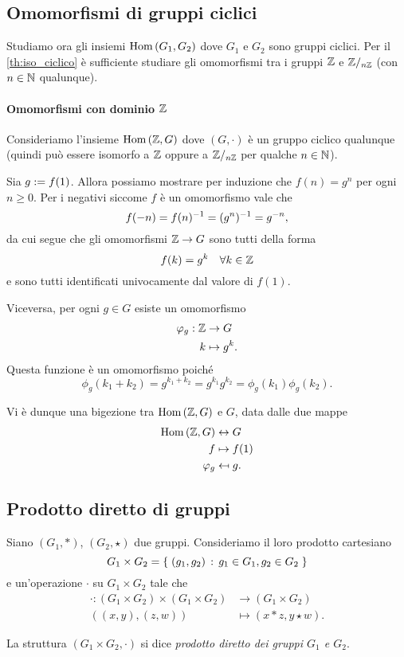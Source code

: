 \subsection{Omomorfismi di gruppi ciclici}

Studiamo ora gli insiemi $\operatorname{Hom}\left(G_1, G_2\right)$ dove $G_1$ e $G_2$ sono gruppi ciclici. Per il \autoref{th:iso_ciclico} è sufficiente studiare gli omomorfismi tra i gruppi $\mathbb{Z}$ e $\mathbb{Z}/_{n\mathbb{Z}}$ (con $n \in \mathbb{N}$ qualunque).

\paragraph{Omomorfismi con dominio $\mathbb{Z}$} Consideriamo l'insieme $\operatorname{Hom}\left(\mathbb{Z}, G\right)$ dove $(G, \cdot)$ è un gruppo ciclico qualunque (quindi può essere isomorfo a $\mathbb{Z}$ oppure a $\mathbb{Z}/_{n\mathbb{Z}}$ per qualche $n \in \mathbb{N}$). 

Sia $g := f(1)$. Allora possiamo mostrare per induzione che $f(n) = g^n$ per ogni $n \geq 0$. Per i negativi siccome $f$ è un omomorfismo vale che \[
    f(-n) = f(n)^{-1} = (g^n)^{-1} = g^{-n},    
\] da cui segue che gli omomorfismi $\mathbb{Z} \to G$ sono tutti della forma \[
    f(k) = g^k \quad \forall k \in \mathbb{Z}
\] e sono tutti identificati univocamente dal valore di $f(1)$.

Viceversa, per ogni $g \in G$ esiste un omomorfismo \begin{align*}
    \varphi_g : \mathbb{Z} &\to G \\
    k &\mapsto g^k.
\end{align*} Questa funzione è un omomorfismo poiché \[
    \phi_g(k_1 + k_2) = g^{k_1 + k_2} = g^{k_1}g^{k_2} = \phi_g(k_1)\phi_g(k_2).
\]

Vi è dunque una bigezione tra $\operatorname{Hom}\left(\mathbb{Z}, G\right)$ e $G$, data dalle due mappe \begin{align*}
    \operatorname{Hom}\left(\mathbb{Z}, G\right) &\leftrightarrow G\\
    f &\mapsto f(1)\\
    \varphi_g &\mapsfrom g.
\end{align*}

\subsection{Prodotto diretto di gruppi}

\begin{definition}
    Siano $(G_1, *)$, $(G_2, \star)$ due gruppi. Consideriamo il loro prodotto cartesiano \[
        G_1 \times G_2 = \left\{\;(g_1, g_2) \,:\, g_1 \in G_1, g_2 \in G_2\;\right\}    
    \] e un'operazione $\cdot$ su $G_1 \times G_2$ tale che \begin{align*}
    \cdot : (G_1 \times G_2) \times (G_1 \times G_2) &\to (G_1 \times G_2)\\
    ((x, y), (z, w)) &\mapsto (x * z, y \star w).
    \end{align*}
    
    La struttura $(G_1 \times G_2, \cdot)$ si dice \emph{prodotto diretto dei gruppi $G_1$ e $G_2$}.
\end{definition}

